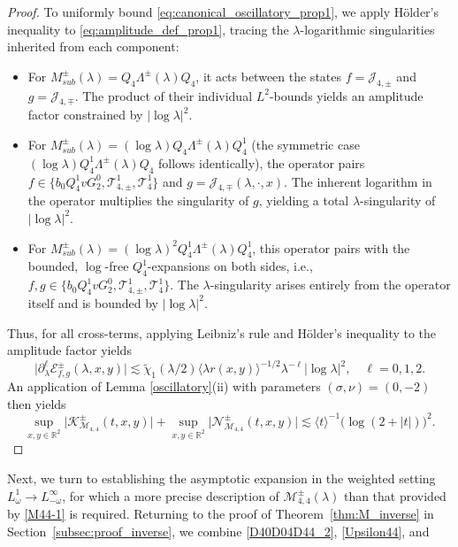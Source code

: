 \documentclass[reqno]{amsart}
\numberwithin{equation}{section}
\begin{document}
\begin{proof}
	To uniformly bound \eqref{eq:canonical_oscillatory_prop1}, we apply H\"older's inequality to \eqref{eq:amplitude_def_prop1}, tracing the $\lambda$-logarithmic singularities inherited from each component:
	\begin{itemize}
		\item For $M_{sub}^\pm(\lambda) = Q_{4} \Lambda^\pm(\lambda) Q_{4}$, it acts between the states $f = \mathcal{J}_{4,\pm}$ and $g = \mathcal{J}_{4,\mp}$. The product of their individual $L^2$-bounds yields an amplitude factor constrained by $ |\log\lambda|^2$.
		\vskip0.2cm
		\item For $M_{sub}^\pm(\lambda) = (\log\lambda) Q_{4} \Lambda^\pm(\lambda) Q_{4}^1$ (the symmetric case $(\log\lambda) Q_{4}^1 \Lambda^\pm(\lambda)Q_{4}$ follows identically),
		the operator pairs $f\in\{b_0 Q_{4}^1 v G_2^0, \mathcal{T}_{4,\pm}^{1}, \mathcal{T}_{4}^{1}\}$ and $g = \mathcal{J}_{4,\mp}(\lambda, \cdot, x)$. The inherent logarithm in the operator multiplies the singularity of $g$, yielding a total $\lambda$-singularity of $ |\log\lambda|^2$.
		\vskip0.2cm
		\item For $M_{sub}^\pm(\lambda) = (\log\lambda)^2 Q_{4}^1 \Lambda^\pm(\lambda) Q_{4}^1$, this operator pairs with the bounded, $\log$-free $Q_{4}^1$-expansions on both sides, i.e., $f,g\in\{b_0 Q_{4}^1 v G_2^0, \mathcal{T}_{4,\pm}^{1}, \mathcal{T}_{4}^{1}\}.$  The $\lambda$-singularity arises entirely from the operator itself and is bounded by $|\log\lambda|^2$.
	\end{itemize}
	Thus, for all cross-terms, applying Leibniz's rule and H\"older's inequality to the amplitude factor yields
	\[
	\bigl| \partial_\lambda^{\ell} \mathcal{E}_{f,g}^\pm(\lambda,x,y) \bigr| \lesssim \widetilde{\chi}_1(\lambda/2) \langle \lambda r(x,y) \rangle^{-1/2} \lambda^{-\ell} |\log\lambda|^2, \quad \ell = 0,1,2.
	\]
	An application of Lemma \ref{oscillatory}(ii) with parameters $(\sigma,\nu)=(0,-2)$ then yields $$
	\sup_{x,y\in \mathbb{R}^2}
	\bigl|
	\mathcal{K}_{\mathcal{M}_{4,4}}^\pm(t,x,y)
	\bigr|
	+
	\sup_{x,y\in \mathbb{R}^2}
	\bigl|
	\mathcal{N}_{\mathcal{M}_{4,4}}^\pm(t,x,y)
	\bigr|
	\lesssim
	\langle t\rangle^{-1}\bigl(\log(2+|t|)\bigr)^2.
	$$
\end{proof}
Next, we turn to establishing the asymptotic expansion in the weighted setting \(L^1_\omega\to L^\infty_{-\omega}\), for which a more precise description of \(\mathcal M_{4,4}^\pm(\lambda)\) than that provided by \eqref{M44-1} is required. Returning to the proof of Theorem~\ref{thm:M_inverse} in Section~\ref{subsec:proof_inverse}, we combine \eqref{D40D04D44_2}, \eqref{Upsilon44}, and 
\end{document}
